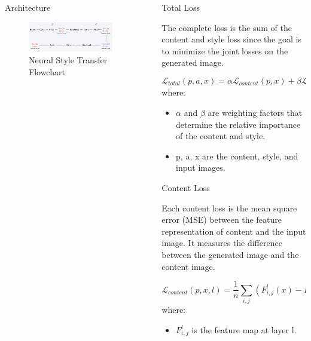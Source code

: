 \documentclass[final]{beamer}
\newlength{\sepwidth}
\newlength{\colwidth}
\newcommand{\separatorcolumn}{\begin{column}{\sepwidth}\end{column}}
\begin{document}
\begin{frame}[t]
\begin{columns}[t]
\begin{column}{\colwidth}
\begin{block}{Architecture}
        \begin{figure}
          \centering
            \includegraphics[width=1\textwidth]{figures/NST Flowchart.png}
        
            \caption{Neural Style Transfer Flowchart}
        \end{figure}
    
    \end{block}

\end{column}

\separatorcolumn

\begin{column}{\colwidth}

  \begin{block}{Total Loss}

    The complete loss is the sum of the content and style loss since the goal is to minimize the joint losses on the generated image.

    $$
    \mathcal{L}_{total}(p, a, x) = \alpha\mathcal{L}_{content}(p, x) + \beta\mathcal{L}_{style}(a, x)
    $$
    where:
    \begin{itemize}
        \item $\alpha$ and $\beta$ are weighting factors that determine the relative importance of the content and style.
        \item p, a, x are the content, style, and input images.
    \end{itemize}

  \end{block}

  \begin{block}{Content Loss}

    Each content loss is the mean square error (MSE) between the feature representation of content and the input image. It measures the difference between the generated image and the content image.

    $$\mathcal{L}_{content}(p, x, l) = \frac{1}{n} \sum_{i, j}(F^l_{i, j}(x) - F^l_{i, j}(p))^2$$
    where:
    \begin{itemize}
        \item $F^l_{i, j}$ is the feature map at layer l.
    \end{itemize}


\end{block}
\end{column}
\end{columns}
\end{frame}
\end{document}
